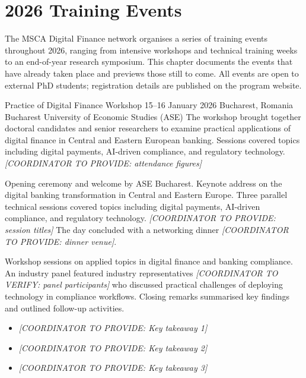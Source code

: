 \chapter{2026 Training Events}
\label{ch:events-2026}

The MSCA Digital Finance network organises a series of training events throughout
2026, ranging from intensive workshops and technical training weeks to an
end-of-year research symposium.  This chapter documents the events that have
already taken place and previews those still to come.  All events are open to
external PhD students; registration details are published on the program website.

\newpage
\eventpage
  {Practice of Digital Finance Workshop}
  {15--16 January 2026}
  {Bucharest, Romania}
  {Bucharest University of Economic Studies (ASE)}
  {The workshop brought together doctoral candidates and senior researchers to
   examine practical applications of digital finance in Central and Eastern
   European banking.  Sessions covered topics including digital payments,
   AI-driven compliance, and regulatory technology.
   \emph{[COORDINATOR TO PROVIDE: attendance figures]}}
  {\begin{description}[leftmargin=0pt, labelindent=0pt, font=\sffamily\bfseries\color{mscaDarkBlue}]
   \item[Day 1 --- 15 January]
     Opening ceremony and welcome by ASE Bucharest.  Keynote address on the
     digital banking transformation in Central and Eastern Europe.  Three
     parallel technical sessions covered topics including digital payments,
     AI-driven compliance, and regulatory technology.
     \emph{[COORDINATOR TO PROVIDE: session titles]}
     The day concluded with a networking dinner
     \emph{[COORDINATOR TO PROVIDE: dinner venue]}.
   \item[Day 2 --- 16 January]
     Workshop sessions on applied topics in digital finance and banking
     compliance.  An industry panel featured
     industry representatives \emph{[COORDINATOR TO VERIFY: panel participants]}
     who discussed practical challenges of deploying technology in compliance
     workflows.  Closing remarks summarised key findings and outlined follow-up
     activities.
   \end{description}}
  {}

\begin{tcolorbox}[colback=mscaLightBlue, colframe=mscaMediumBlue, title={Key Outcomes}]
\begin{itemize}[nosep]
  \item \emph{[COORDINATOR TO PROVIDE: Key takeaway 1]}
  \item \emph{[COORDINATOR TO PROVIDE: Key takeaway 2]}
  \item \emph{[COORDINATOR TO PROVIDE: Key takeaway 3]}
\end{itemize}
\end{tcolorbox}

